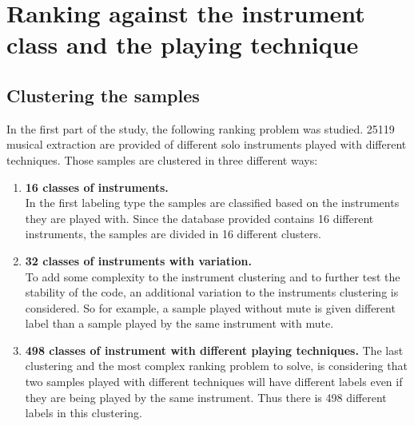\documentclass[hidelinks,12pt]{report}
\begin{document}
\chapter{Ranking against the instrument class and the playing technique}
\section{Clustering the samples}

In the first part of the study, the following ranking problem was studied. 25119 musical extraction are provided of different solo instruments played with different techniques. Those samples are clustered in three different ways: 
\begin{enumerate}
\item \textbf{ 16 classes of instruments.}\\
In the first labeling type the samples are classified based on the instruments they are played with. Since the database provided contains 16 different instruments, the samples are divided in 16 different clusters.
\item \textbf{32 classes of instruments with variation.}\\
To add some complexity to the instrument clustering and to further test the stability of the code, an additional variation to the instruments clustering is considered. So for example, a sample played without mute is given different label than a sample played by the same instrument with mute.
\item \textbf{498 classes of instrument with different playing techniques.}
The last clustering and the most complex ranking problem to solve, is considering that two samples played with different techniques will have different labels even if they are being played by the same instrument. Thus there is 498 different labels in this clustering.\\

\end{enumerate}
\end{document}

